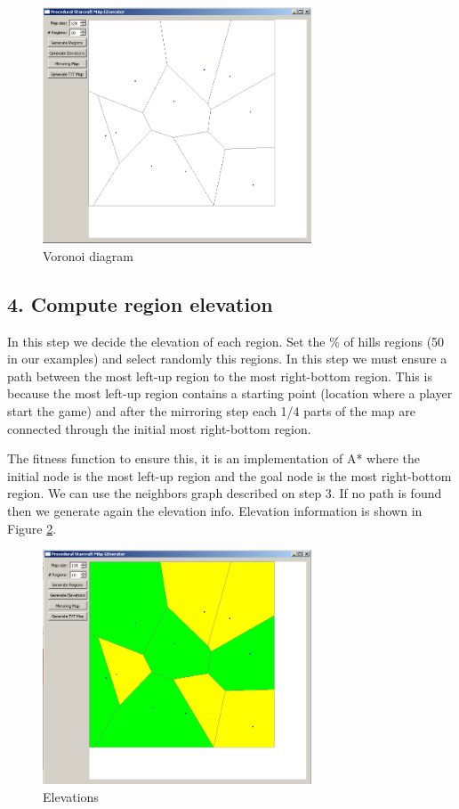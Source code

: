 \documentclass[letterpaper]{article}
\begin{document}
\begin{figure}[ht]
    \centering
    \includegraphics[width=8cm]{PCG02.png}
    \caption{Voronoi diagram}
    \label{fig:voronoi-diagram}
\end{figure}

\subsection{4. Compute region elevation}
In this step we decide the elevation of each region. Set the \% of hills regions (50 in our examples) and select randomly this regions. In this step we must ensure a path between the most left-up region to the most right-bottom region. This is because the most left-up region contains a starting point (location where a player start the game) and after the mirroring step each 1/4 parts of the map are connected through the initial most right-bottom region.

The fitness function to ensure this, it is an implementation of A* where the initial node is the most left-up region and the goal node is the most right-bottom region. We can use the neighbors graph described on step 3. If no path is found then we generate again the elevation info. Elevation information is shown in Figure \ref{fig:elevations}.

\begin{figure}[ht]
    \centering
    \includegraphics[width=8cm]{PCG03.png}
    \caption{Elevations}
    \label{fig:elevations}
\end{figure}
\end{document}
